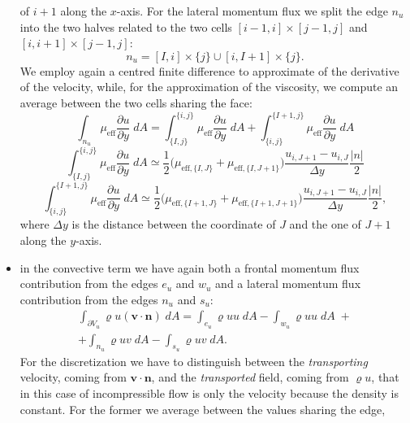 \begin{itemize}
	of $i+1$ along the $x$-axis. For the lateral momentum flux we split the 
	edge $n_u$ into the two halves related to the two cells 
	$[i-1,i]\times[j-1,j]$ and $[i,i+1]\times[j-1,j]$:
	\begin{equation}
	n_u = [I,i]\times \{j\} \cup [i,I+1] \times \{j\}.
	\end{equation}
	We employ again a centred finite difference to approximate of the 
	derivative of the velocity, while, for the approximation of the viscosity, 
	we compute an average between the two cells sharing the face:
	\begin{equation}
	\int_{n_u} \mu_\text{eff} \frac{\partial u}{\partial y} \; dA = 
	\int_{\{I,j\}}^{\{i,j\}} \mu_\text{eff} \frac{\partial u}{\partial y} \; dA 
	+\int_{\{i,j\}}^{\{I+1,j\}} \mu_\text{eff} \frac{\partial u}{\partial y} \; 
	dA
	\end{equation}
	\begin{equation*}
	\int_{\{I,j\}}^{\{i,j\}} \mu_\text{eff} \frac{\partial u}{\partial y} \; dA 
	\simeq \frac{1}{2}\big(\mu_{\text{eff},\{I,J\}}+\mu_{\text{eff},\{I,J+1\}} 
	\big) \frac{u_{i,J+1}-u_{i,J}}{\Delta y} \frac{|n|}{2} 
	\end{equation*}
	\begin{equation*}
	\int_{\{i,j\}}^{\{I+1,j\}} \mu_\text{eff} \frac{\partial u}{\partial y} \; 
	dA \simeq \frac{1}{2}\big( \mu_{\text{eff},\{I+1,J\}}+ 
	\mu_{\text{eff},\{I+1,J+1\}} \big) \frac{u_{i,J+1}-u_{i,J}}{\Delta y} 
	\frac{|n|}{2},
	\end{equation*}
	where $\Delta y$ is the distance between the coordinate of $J$ and the one 
	of $J+1$ along the $y$-axis.
	\item in the convective term we have again both a frontal momentum flux 
	contribution from the edges $e_u$ and $w_u$ and a lateral momentum flux 
	contribution from the edges $n_u$ and $s_u$:
	\begin{multline}
	\int_{\partial V_u} \varrho u (\mathbf{v} \cdot \mathbf{n}) \; dA = 
	\int_{e_u} \varrho u u \; dA - \int_{w_u} \varrho u u \; dA \; +\\
	+ \int_{n_u} \varrho u v \; dA  -\int_{s_u} \varrho u v \; dA.
	\end{multline}
	For the discretization we have to distinguish between the 
	\emph{transporting} velocity, coming from $\mathbf{v} \cdot \mathbf{n}$, 
	and the \emph{transported} field, coming from $\varrho u$, that in this 
	case of incompressible flow is only the velocity because the density is 
	constant. For the former we average between the values sharing the edge, 

\end{itemize}
